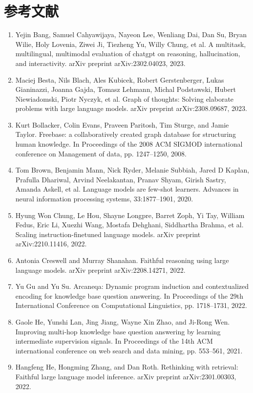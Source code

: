 \documentclass[11pt,UTF8,fontset=fandol]{ctexart}
\begin{document}
\section*{参考文献}
\begin{enumerate}[leftmargin=2em]
\item Yejin Bang, Samuel Cahyawijaya, Nayeon Lee, Wenliang Dai, Dan Su, Bryan Wilie, Holy Lovenia, Ziwei Ji, Tiezheng Yu, Willy Chung, et al. A multitask, multilingual, multimodal evaluation of chatgpt on reasoning, hallucination, and interactivity. arXiv preprint arXiv:2302.04023, 2023.
\item Maciej Besta, Nils Blach, Ales Kubicek, Robert Gerstenberger, Lukas Gianinazzi, Joanna Gajda, Tomasz Lehmann, Michal Podstawski, Hubert Niewiadomski, Piotr Nyczyk, et al. Graph of thoughts: Solving elaborate problems with large language models. arXiv preprint arXiv:2308.09687, 2023.
\item Kurt Bollacker, Colin Evans, Praveen Paritosh, Tim Sturge, and Jamie Taylor. Freebase: a collaboratively created graph database for structuring human knowledge. In Proceedings of the 2008 ACM SIGMOD international conference on Management of data, pp. 1247--1250, 2008.
\item Tom Brown, Benjamin Mann, Nick Ryder, Melanie Subbiah, Jared D Kaplan, Prafulla Dhariwal, Arvind Neelakantan, Pranav Shyam, Girish Sastry, Amanda Askell, et al. Language models are few-shot learners. Advances in neural information processing systems, 33:1877--1901, 2020.
\item Hyung Won Chung, Le Hou, Shayne Longpre, Barret Zoph, Yi Tay, William Fedus, Eric Li, Xuezhi Wang, Mostafa Dehghani, Siddhartha Brahma, et al. Scaling instruction-finetuned language models. arXiv preprint arXiv:2210.11416, 2022.
\item Antonia Creswell and Murray Shanahan. Faithful reasoning using large language models. arXiv preprint arXiv:2208.14271, 2022.
\item Yu Gu and Yu Su. Arcaneqa: Dynamic program induction and contextualized encoding for knowledge base question answering. In Proceedings of the 29th International Conference on Computational Linguistics, pp. 1718--1731, 2022.
\item Gaole He, Yunshi Lan, Jing Jiang, Wayne Xin Zhao, and Ji-Rong Wen. Improving multi-hop knowledge base question answering by learning intermediate supervision signals. In Proceedings of the 14th ACM international conference on web search and data mining, pp. 553--561, 2021.
\item Hangfeng He, Hongming Zhang, and Dan Roth. Rethinking with retrieval: Faithful large language model inference. arXiv preprint arXiv:2301.00303, 2022.

\end{enumerate}
\end{document}
